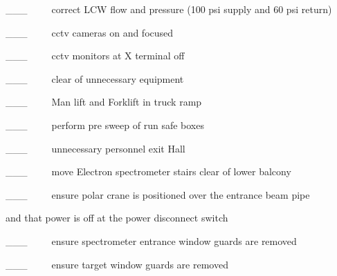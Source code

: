 \_\_\_~~~~~correct LCW flow and pressure (100 psi supply and 60 psi return)

\_\_\_~~~~~cctv cameras on and focused

\_\_\_~~~~~cctv monitors at X terminal off

\_\_\_~~~~~clear of unnecessary equipment

\_\_\_~~~~~Man lift and Forklift in truck ramp

\_\_\_~~~~~perform pre sweep of run safe boxes

\_\_\_~~~~~unnecessary personnel exit Hall

\_\_\_~~~~~move Electron spectrometer stairs clear of lower balcony

\_\_\_~~~~~ensure polar crane is positioned over the entrance beam pipe 

and that power is off at the power disconnect switch 

\_\_\_~~~~~ensure spectrometer entrance window guards are removed

\_\_\_~~~~~ensure target window guards are removed
